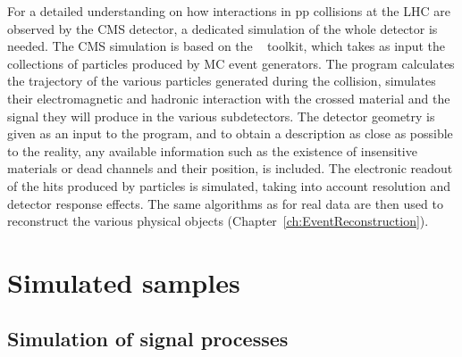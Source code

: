 For a detailed understanding on how interactions in pp collisions at the LHC are observed by the CMS detector, a dedicated simulation of the whole detector is needed.
The CMS simulation is based on the \GEANTfour~\cite{Agostinelli:2002hh} toolkit, which takes as input the collections of particles produced by MC event generators.
The program calculates the trajectory of the various particles generated during the collision, simulates their electromagnetic and hadronic interaction with the crossed material and the signal they will produce in the various subdetectors. The detector geometry is given as an input to the program, and to obtain a description as close as possible to the reality, any available information such as the existence of insensitive materials or dead channels and their position, is included. The electronic readout of the hits produced by particles is simulated, taking into account resolution and detector response effects.
The same algorithms as for real data are then used to reconstruct the various physical objects (Chapter~\ref{ch:EventReconstruction}).

\section{Simulated samples}\label{sec:MCsamples}

\subsection{Simulation of signal processes}\label{subsec:signalMC}

